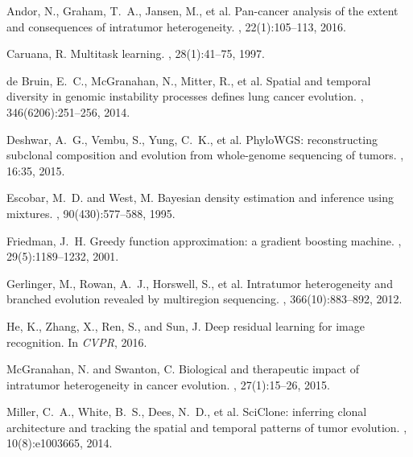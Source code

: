 \documentclass{article}
\begin{document}
\small

\begin{thebibliography}{}

Andor, N., Graham, T.~A., Jansen, M., et al.
\newblock Pan-cancer analysis of the extent and consequences of intratumor
heterogeneity.
, 22(1):105--113, 2016.

Caruana, R.
\newblock Multitask learning.
, 28(1):41--75, 1997.

de Bruin, E.~C., McGranahan, N., Mitter, R., et al.
\newblock Spatial and temporal diversity in genomic instability processes defines
lung cancer evolution.
, 346(6206):251--256, 2014.

Deshwar, A.~G., Vembu, S., Yung, C.~K., et al.
\newblock PhyloWGS: reconstructing subclonal composition and evolution from
whole-genome sequencing of tumors.
, 16:35, 2015.

Escobar, M.~D. and West, M.
\newblock Bayesian density estimation and inference using mixtures.
, 90(430):577--588,
1995.

Friedman, J.~H.
\newblock Greedy function approximation: a gradient boosting machine.
, 29(5):1189--1232, 2001.

Gerlinger, M., Rowan, A.~J., Horswell, S., et al.
\newblock Intratumor heterogeneity and branched evolution revealed by multiregion
sequencing.
, 366(10):883--892, 2012.

He, K., Zhang, X., Ren, S., and Sun, J.
\newblock Deep residual learning for image recognition.
\newblock In {\em CVPR}, 2016.

McGranahan, N. and Swanton, C.
\newblock Biological and therapeutic impact of intratumor heterogeneity in cancer
evolution.
, 27(1):15--26, 2015.

Miller, C.~A., White, B.~S., Dees, N.~D., et al.
\newblock SciClone: inferring clonal architecture and tracking the spatial and
temporal patterns of tumor evolution.
, 10(8):e1003665, 2014.


\end{thebibliography}
\end{document}
